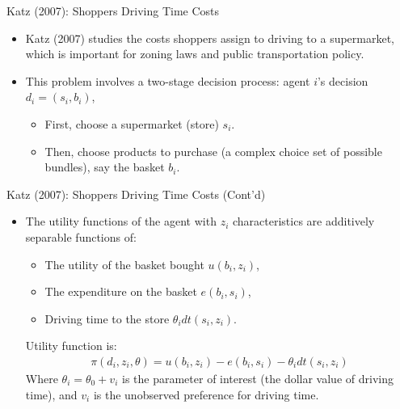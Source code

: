 \documentclass[aspectratio=169]{beamer}  %
\begin{document}
\begin{frame}{Katz (2007): Shoppers Driving Time Costs}
    \begin{itemize}
        \item Katz (2007) studies the costs shoppers assign to driving to a supermarket, which is important for zoning laws and public transportation policy.
\vspace{0.5cm}
        \item This problem involves a two-stage decision process: agent $i$'s decision $d_i = (s_i, b_i)$,
            \begin{itemize}
                \item First, choose a supermarket (store) $s_i$.
                \item Then, choose products to purchase (a complex choice set of possible bundles), say the basket $b_i$.
            \end{itemize}
        \end{itemize}

\end{frame}


\begin{frame}{Katz (2007): Shoppers Driving Time Costs (Cont'd)}
    \begin{itemize}
    \item The utility functions of the agent with $z_i$ characteristics are additively separable functions of:
            \begin{itemize}
                \item The utility of the basket bought $u\left(b_i, z_i\right)$,
                \item The expenditure on the basket $e\left(b_i, s_i\right)$,
                \item Driving time to the store $\theta_i dt\left(s_i, z_i\right)$.
            \end{itemize}
            \vspace{0.5cm}
            Utility function is:
        \begin{align*}
            \pi(d_i, z_i, \theta) = u(b_i, z_i) - e(b_i, s_i) - \theta_i dt(s_i, z_i)
        \end{align*}
        Where $\theta_i = \theta_0 + v_i$ is the parameter of interest (the dollar value of driving time), and $v_i$ is the unobserved preference for driving time.
        \end{itemize}

\end{frame}
\end{document}
